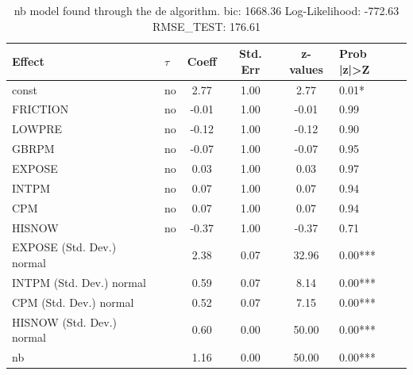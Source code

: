 \begin{table}
	\caption{nb model found through the de algorithm. bic: 1668.36 Log-Likelihood: -772.63 RMSE_TEST: 176.61}
	\begin{center}
		\begin{tabular}{|l|l|c|c|c|l|}
			\hline
			Effect & $\tau$ & Coeff & Std. Err & z-values & Prob |z|>Z \\
			\hline
			const & no & 2.77 & 1.00 & 2.77 & 0.01* \\
			\hline
			FRICTION & no & -0.01 & 1.00 & -0.01 & 0.99 \\
			\hline
			LOWPRE & no & -0.12 & 1.00 & -0.12 & 0.90 \\
			\hline
			GBRPM & no & -0.07 & 1.00 & -0.07 & 0.95 \\
			\hline
			EXPOSE & no & 0.03 & 1.00 & 0.03 & 0.97 \\
			\hline
			INTPM & no & 0.07 & 1.00 & 0.07 & 0.94 \\
			\hline
			CPM & no & 0.07 & 1.00 & 0.07 & 0.94 \\
			\hline
			HISNOW & no & -0.37 & 1.00 & -0.37 & 0.71 \\
			\hline
			EXPOSE (Std. Dev.) normal &  & 2.38 & 0.07 & 32.96 & 0.00*** \\
			\hline
			INTPM (Std. Dev.) normal &  & 0.59 & 0.07 & 8.14 & 0.00*** \\
			\hline
			CPM (Std. Dev.) normal &  & 0.52 & 0.07 & 7.15 & 0.00*** \\
			\hline
			HISNOW (Std. Dev.) normal &  & 0.60 & 0.00 & 50.00 & 0.00*** \\
			\hline
			nb &  & 1.16 & 0.00 & 50.00 & 0.00*** \\
			\hline
		\end{tabular}
	\end{center}
\end{table}